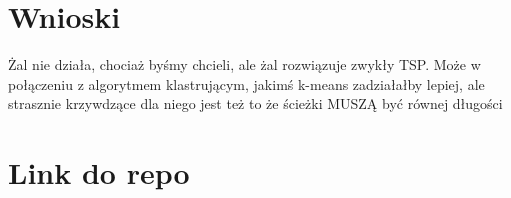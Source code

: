 \documentclass[11pt]{article}
\begin{document}
\section{Wnioski}\label{sec:wnioski}

Żal nie działa, chociaż byśmy chcieli, ale żal rozwiązuje zwykły TSP.
Może w połączeniu z algorytmem klastrującym, jakimś k-means zadziałałby lepiej, ale strasznie krzywdzące dla niego jest też to że ścieżki MUSZĄ być równej długości

\section{Link do repo}\label{sec:link-do-repo}
\end{document}
